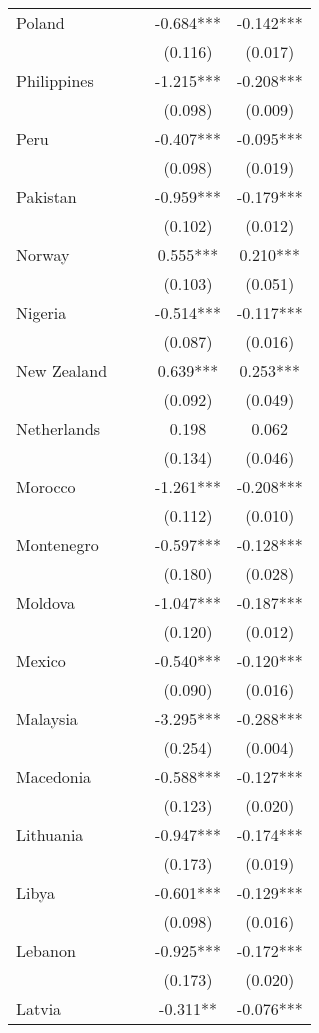 \documentclass[]{article}
\begin{document}
\begin{tabular}{lcccc}
Poland &  &  & -0.684*** & -0.142*** \\
 &  &  & (0.116) & (0.017) \\
Philippines &  &  & -1.215*** & -0.208*** \\
 &  &  & (0.098) & (0.009) \\
Peru &  &  & -0.407*** & -0.095*** \\
 &  &  & (0.098) & (0.019) \\
Pakistan &  &  & -0.959*** & -0.179*** \\
 &  &  & (0.102) & (0.012) \\
Norway &  &  & 0.555*** & 0.210*** \\
 &  &  & (0.103) & (0.051) \\
Nigeria &  &  & -0.514*** & -0.117*** \\
 &  &  & (0.087) & (0.016) \\
New Zealand &  &  & 0.639*** & 0.253*** \\
 &  &  & (0.092) & (0.049) \\
Netherlands &  &  & 0.198 & 0.062 \\
 &  &  & (0.134) & (0.046) \\
Morocco &  &  & -1.261*** & -0.208*** \\
 &  &  & (0.112) & (0.010) \\
Montenegro &  &  & -0.597*** & -0.128*** \\
 &  &  & (0.180) & (0.028) \\
Moldova &  &  & -1.047*** & -0.187*** \\
 &  &  & (0.120) & (0.012) \\
Mexico &  &  & -0.540*** & -0.120*** \\
 &  &  & (0.090) & (0.016) \\
Malaysia &  &  & -3.295*** & -0.288*** \\
 &  &  & (0.254) & (0.004) \\
Macedonia &  &  & -0.588*** & -0.127*** \\
 &  &  & (0.123) & (0.020) \\
Lithuania &  &  & -0.947*** & -0.174*** \\
 &  &  & (0.173) & (0.019) \\
Libya &  &  & -0.601*** & -0.129*** \\
 &  &  & (0.098) & (0.016) \\
Lebanon &  &  & -0.925*** & -0.172*** \\
 &  &  & (0.173) & (0.020) \\
Latvia &  &  & -0.311** & -0.076*** \\

\end{tabular}
\end{document}
